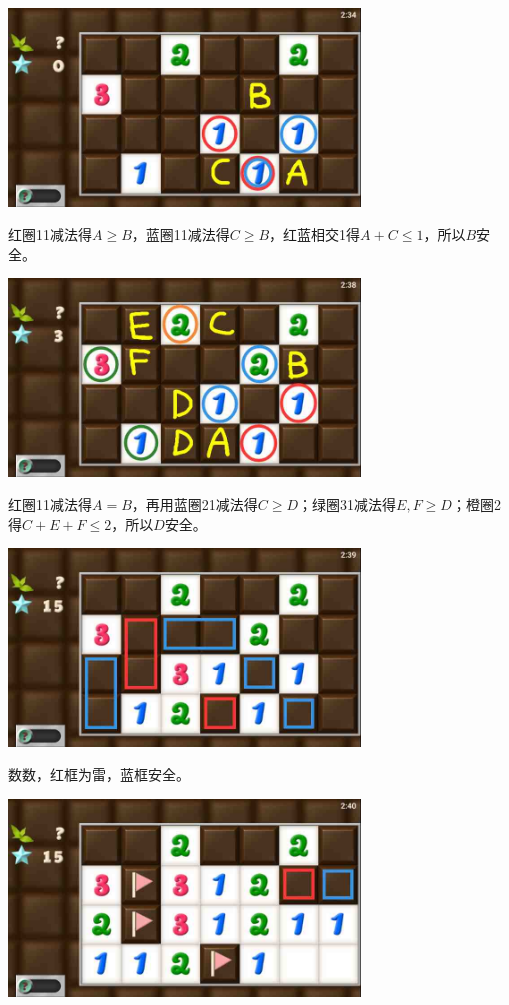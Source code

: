 \subsection{} %
\begin{center}
    \includegraphics[width=0.7\textwidth]{puzzlelow/206-1.jpg}
\end{center}
红圈11减法得$A\ge B$，蓝圈11减法得$C\ge B$，红蓝相交1得$A+C\le 1$，所以$B$安全。
\begin{center}
    \includegraphics[width=0.7\textwidth]{puzzlelow/206-2.jpg}
\end{center}
红圈11减法得$A=B$，再用蓝圈21减法得$C\ge D$；绿圈31减法得$E,F\ge D$；橙圈2得$C+E+F\le 2$，所以$D$安全。
\begin{center}
    \includegraphics[width=0.7\textwidth]{puzzlelow/206-3.jpg}
\end{center}
数数，红框为雷，蓝框安全。
\begin{center}
    \includegraphics[width=0.7\textwidth]{puzzlelow/206-4.jpg}
\end{center}
